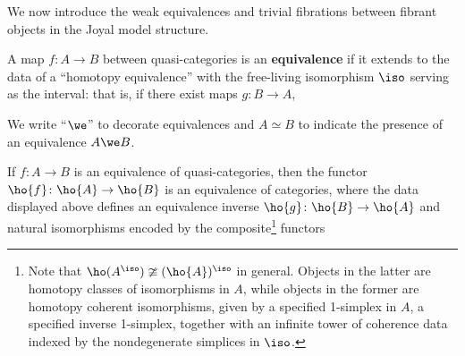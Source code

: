 We now introduce the weak equivalences and trivial fibrations between fibrant objects in the Joyal model structure.

\begin{definition}\label{defn:qcat-equivalence}
  \leanok
  A map $f \colon A \to B$ between quasi-categories is an \textbf{equivalence} if it extends to the data of a ``homotopy equivalence'' with the free-living isomorphism $\iso$ serving as the interval: that is, if there exist maps $g \colon B \to A$,
  \begin{center}
  \end{center}
  We write ``$\we$'' to decorate equivalences and $A \simeq B$ to indicate the presence of an equivalence $A \we B$.
  \end{definition}

  \begin{lemma}\label{lem:qcat-htpy-cat-equiv}
    If $f \colon A \to B$ is an equivalence of quasi-categories, then the functor $\ho{f} \colon \ho{A} \to \ho{B}$ is an equivalence of categories, where the data displayed above defines an equivalence inverse $\ho{g} \colon \ho{B} \to \ho{A}$ and natural isomorphisms encoded by the composite\footnote{Note that $\ho(A^\iso) \ncong (\ho{A})^\iso$ in general. Objects in the latter are homotopy classes of isomorphisms in $A$, while objects in the former are homotopy coherent isomorphisms, given by a specified 1-simplex in $A$, a specified inverse 1-simplex, together with an infinite tower of coherence data indexed by the nondegenerate simplices in $\iso$.} functors
  \begin{center} 
  \end{center}
  \end{lemma}

